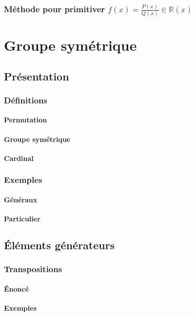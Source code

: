 \documentclass[12pt,a4paper,french]{book}
\begin{document}
		\subsection{Méthode pour primitiver $f(x)=\frac{P(x)}{Q(x)} \in \mathbb{R}(x)$}
		
\chapter{Groupe symétrique}
	\section{Présentation}
		\subsection{Définitions}
			\subsubsection{Permutation}
			\subsubsection{Groupe symétrique}
			\subsubsection{Cardinal}
		\subsection{Exemples}
			\subsubsection{Généraux}
			\subsubsection{Particulier}
	\section{Éléments générateurs}
		\subsection{Transpositions}
			\subsubsection{Énoncé}
			\subsubsection{Exemples}
\end{document}
